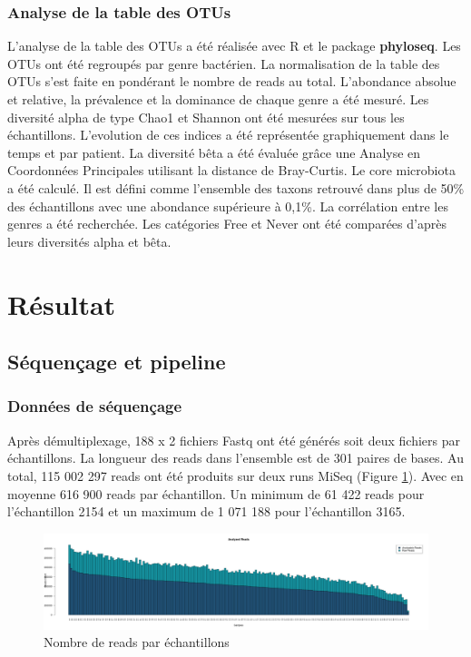 \documentclass[12pt,a4paper]{article}
\begin{document}
\subsubsection{Analyse de la table des OTUs}
L’analyse de la table des OTUs a été réalisée avec R et le package \textbf{phyloseq}\cite{McMurdie2013}. Les OTUs ont été regroupés par genre bactérien. La normalisation de la table des OTUs s'est faite en pondérant le nombre de reads au total.
L'abondance absolue et relative, la prévalence et la dominance de chaque genre a été mesuré.
Les diversité alpha de type Chao1 et Shannon ont été mesurées sur tous les échantillons. L'evolution de ces indices a été représentée graphiquement dans le temps et par patient.
La diversité bêta a été évaluée grâce une Analyse en Coordonnées Principales utilisant la distance de Bray-Curtis.
Le core microbiota\cite{VanderGast2011} a été calculé. Il est défini comme l’ensemble des taxons retrouvé dans plus de 50\% des échantillons avec une abondance supérieure à 0,1\%.
La corrélation entre les genres a été recherchée.
Les catégories Free et Never ont été comparées d’après leurs diversités alpha et bêta.



\section{Résultat}
\subsection{Séquençage et pipeline}
\subsubsection{Données de séquençage}
Après démultiplexage, 188 x 2 fichiers Fastq ont été générés soit deux fichiers par échantillons.
La longueur des reads dans l'ensemble est de 301 paires de bases.
Au total, 115 002 297 reads ont été produits sur deux runs MiSeq (Figure \ref{readcount}). Avec en moyenne 616 900 reads par échantillon. Un minimum de 61 422 reads pour l’échantillon 2154 et un maximum de 1 071 188 pour l’échantillon 3165.


\begin{figure}[ht]
\begin{center}
\includegraphics[scale=0.25]{img/pipeline.png}\hfill
\end{center}
\caption{Nombre de reads par échantillons}
\label{readcount}
\end{figure}
\end{document}
